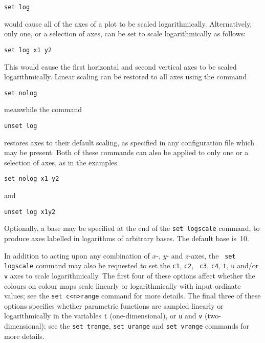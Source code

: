 \begin{verbatim}
set log
\end{verbatim}

\noindent would cause all of the axes of a plot to be scaled logarithmically.
Alternatively, only one, or a selection of axes, can be set to scale
logarithmically as follows:

\begin{verbatim}
set log x1 y2
\end{verbatim}

\noindent This would cause the first horizontal and second vertical axes to be
scaled logarithmically.  Linear scaling can be restored to all axes using the
command

\begin{verbatim}
set nolog
\end{verbatim}

\noindent meanwhile the command

\begin{verbatim}
unset log
\end{verbatim}

\noindent restores axes to their default scaling, as specified in any
configuration file which may be present. Both of these commands can also be
applied to only one or a selection of axes, as in the examples

\begin{verbatim}
set nolog x1 y2
\end{verbatim}

\noindent and

\begin{verbatim}
unset log x1y2
\end{verbatim}

Optionally, a base may be specified at the end of the {\tt set logscale}
command, to produce axes labelled in logarithms of arbitrary bases.  The
default base is~10.

In addition to acting upon any combination of $x$-, $y$- and $z$-axes, the {\tt
set logscale} command may also be requested to set the {\tt c1}, {\tt c2}, {\tt
c3}, {\tt c4}, {\tt t}, {\tt u} and/or {\tt v} axes to scale logarithmically.
The first four of these options affect whether the colours on colour maps scale
linearly or logarithmically with input ordinate values; see the {\tt set
c<n>range} command for more details. The final three of these options specifies
whether parametric functions are sampled linearly or logarithmically in the
variables {\tt t} (one-dimensional), or {\tt u} and {\tt v} (two-dimensional);
see the {\tt set trange}, {\tt set urange} and {\tt set vrange} commands for
more details.


